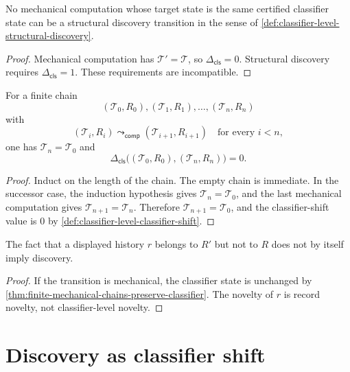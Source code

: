 \begin{theorem}
\label{thm:mechanical-computation-is-not-discovery}
No mechanical computation whose target state is the same certified classifier
state can be a structural discovery transition in the sense of
\autoref{def:classifier-level-structural-discovery}.
\end{theorem}
\begin{proof}
Mechanical computation has $\mathcal T'=\mathcal T$, so
$\Delta_{\mathsf{cls}}=0$. Structural discovery requires
$\Delta_{\mathsf{cls}}=1$. These requirements are incompatible.
\end{proof}

\begin{theorem}
\label{thm:finite-mechanical-chains-preserve-classifier}
For a finite chain
$$
(\mathcal T_0,R_0),
(\mathcal T_1,R_1),
\ldots,
(\mathcal T_n,R_n)
$$
with
$$
(\mathcal T_i,R_i)\leadsto_{\mathsf{comp}}(\mathcal T_{i+1},R_{i+1})
\quad\text{for every }i<n,
$$
one has $\mathcal T_n=\mathcal T_0$ and
$$
\Delta_{\mathsf{cls}}
\bigl((\mathcal T_0,R_0),(\mathcal T_n,R_n)\bigr)=0.
$$
\end{theorem}
\begin{proof}
Induct on the length of the chain. The empty chain is immediate. In the
successor case, the induction hypothesis gives $\mathcal T_n=\mathcal T_0$,
and the last mechanical computation gives $\mathcal T_{n+1}=\mathcal T_n$.
Therefore $\mathcal T_{n+1}=\mathcal T_0$, and the classifier-shift value is
$0$ by \autoref{def:classifier-level-classifier-shift}.
\end{proof}

\begin{corollary}
\label{cor:output-novelty-is-not-classifier-discovery}
The fact that a displayed history $r$ belongs to $R'$ but not to $R$ does not
by itself imply discovery.
\end{corollary}
\begin{proof}
If the transition is mechanical, the classifier state is unchanged by
\autoref{thm:finite-mechanical-chains-preserve-classifier}. The novelty of
$r$ is record novelty, not classifier-level novelty.
\end{proof}

\section{Discovery as classifier shift}
\label{sec:classifier-level-information-discovery}

